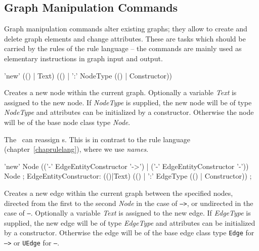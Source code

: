 \subsection{Graph Manipulation Commands}
\label{mani}
Graph manipulation commands alter existing graphs; they allow to create and delete graph elements and change attributes. 
These are tasks which should be carried by the rules of the rule language -- the commands are mainly used as elementary instructions in graph input and output.

\begin{rail}
  'new' (() | Text) (() | ':' NodeType (() | Constructor))
\end{rail}
Creates a new node within the current graph.
Optionally a variable \emph{Text} is assigned to the new node.
If \emph{NodeType} is supplied, the new node will be of type \emph{NodeType} and attributes can be initialized by a constructor.
Otherwise the node will be of the base node class type \emph{Node}.
\begin{note}
The \GrShell\ can reassign s. 
This is in contrast to the rule language (chapter~\ref{chaprulelang}), where we use \emph{names}.
\end{note}

\begin{rail}
  'new' Node (('-' EdgeEntityConstructor '->') | ('-' EdgeEntityConstructor '-')) Node ;
EdgeEntityConstructor:
  (()|Text) (() | ':' EdgeType (() | Constructor)) ;
\end{rail}
Creates a new edge within the current graph between the specified nodes,
directed from the first to the second \emph{Node} in the case of \texttt{-->},
or undirected in the case of \texttt{--}.
Optionally a variable \emph{Text} is assigned to the new edge.
If \emph{EdgeType} is supplied, the new edge will be of type \emph{EdgeType} and attributes can be initialized by a constructor.
Otherwise the edge will be of the base edge class type \texttt{Edge} for \texttt{-->} or \texttt{UEdge} for \texttt{--}.

